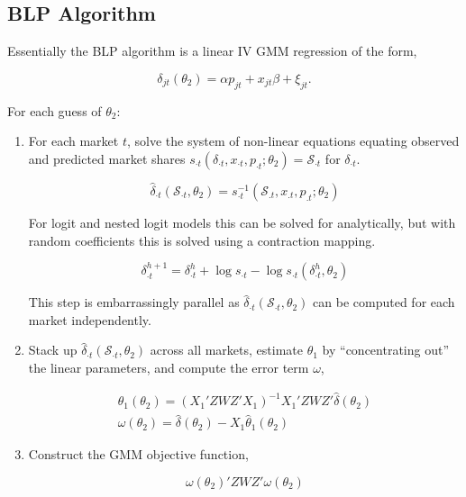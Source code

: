 \documentclass[parskip=half]{scrartcl}
\begin{document}
\subsection{BLP Algorithm}

Essentially the BLP algorithm is a linear IV GMM regression of the form,

\begin{equation}
\delta_{jt}(\theta_2) = \alpha p_{jt} + x_{jt} \beta + \xi_{jt}.
\end{equation}

For each guess of \(\theta_2\):

\begin{enumerate}
	
\item For each market \(t\), solve the system of non-linear equations equating observed and predicted market shares \(s_{\cdot t}(\delta_{\cdot t}, x_{\cdot t}, p_{\cdot t}; \theta_2) = \mathcal{S}_{\cdot t}\) for \(\delta_{\cdot t}\).	
	
\begin{equation}
\label{eq:market_inversion}
\hat\delta_{\cdot t}( \mathcal{S}_{\cdot t}, \theta_2) = s^{-1}_{\cdot t}(\mathcal{S}_{.t}, x_{.t}, p_{.t}; \theta_2)
\end{equation}

For logit and nested logit models this can be solved for analytically, but with random coefficients this is solved using a contraction mapping.

\begin{equation}
\label{eq:contraction}
\delta_{\cdot t}^{h+1} = \delta_{\cdot t}^h + \log s_{\cdot t} - \log s_{\cdot t}(\delta_{\cdot t}^h, \theta_2)
\end{equation}

This step is embarrassingly parallel as \(\hat\delta_{\cdot t}( \mathcal{S}_{\cdot t}, \theta_2)\) can be computed for each market independently.

\item Stack up \(\hat\delta_{\cdot t}( \mathcal{S}_{\cdot t}, \theta_2)\) across all markets, estimate \(\theta_1\) by ``concentrating out'' the linear parameters, and compute the error term \(\omega\),

\begin{gather}
\hat{\theta}_1(\theta_2) = (X_1'ZWZ'X_1)^{-1}X_1'ZWZ'\hat{\delta}(\theta_2) \\
\omega(\theta_2) = \hat{\delta}(\theta_2) - X_1 \hat{\theta}_1(\theta_2)
\end{gather}

\item Construct the GMM objective function,

\begin{equation}
\omega(\theta_2)' Z W Z' \omega(\theta_2)
\end{equation}
	
\end{enumerate}
\end{document}
